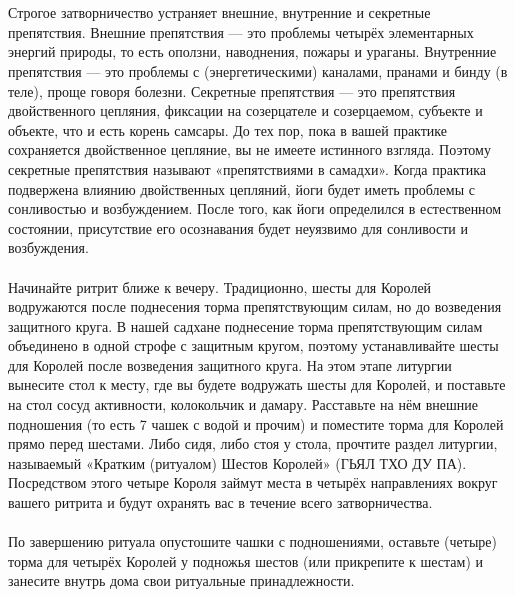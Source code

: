 \\ \\ Строгое затворничество устраняет внешние, внутренние и секретные препятствия. Внешние препятствия — это проблемы четырёх элементарных энергий природы, то есть оползни, наводнения, пожары и ураганы. Внутренние препятствия — это проблемы с (энергетическими) каналами, пранами и бинду (в теле), проще говоря болезни. Секретные препятствия — это препятствия двойственного цепляния, фиксации на созерцателе и созерцаемом, субъекте и объекте, что и есть корень самсары. До тех пор, пока в вашей практике сохраняет\-ся двойственное цепляние, вы не имеете истинного взгляда. Поэтому секретные препятствия называют «препятствиями в самадхи». Когда практика подвержена влиянию двойственных цепляний, йоги будет иметь проблемы с сонливостью и возбуждением. После того, как йоги определился в естественном состоянии, присутствие его осознавания будет неуязвимо для сонливости и возбуждения.
\\ \\ Начинайте ритрит ближе к вечеру. Традиционно, шесты для Королей водружаются
      после поднесения торма препятствующим силам, но до возведения защитного круга.
      В нашей садхане поднесение торма препятствующим силам объедине\-но в одной
      строфе с защитным кругом, поэтому устанавливайте шесты для Королей после
      возведения защитного круга. На этом этапе литургии вынесите стол к месту,
      где вы будете водружать шесты для Королей, и поставьте на стол сосуд активности,
      колокольчик и дамару. Расставьте на нём внешние подношения (то есть 7 чашек с
      водой и прочим) и поместите торма для Королей прямо перед шестами. Либо сидя,
      либо стоя у стола, прочтите раздел литургии, называемый «Кратким (ритуалом)
      Шестов Королей» (ГЬЯЛ ТХО ДУ ПА). Посредством этого четыре Короля займут
      места в четырёх направлениях вокруг вашего ритрита и будут охранять вас
      в течение всего затворничества.
\\ \\ По завершению ритуала опустошите чашки с подношениями, оставьте (четыре) торма для четырёх Королей у подножья шестов (или прикрепите к шестам) и занесите внутрь дома свои ритуальные принадлежности.
\newpage
